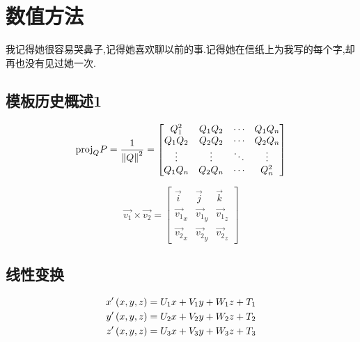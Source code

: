 \chapter{数值方法}
\begin{center}
    \textcolor[RGB]{255, 0, 0}{\faHeart}我记得她很容易哭鼻子,记得她喜欢聊以前的事.记得她在信纸上为我写的每个字,却再也没有见过她一次.\textcolor[RGB]{255, 0, 0}{\faHeart}
\end{center}
\vspace{-5pt}
\begin{center}
\end{center}

\section{模板历史概述1}
\[
    \mathrm{proj}_QP=\frac{1}{\left\| Q \right\|^2}=
    \begin{bmatrix}
        Q_1^2  & Q_1Q_2 & \cdots & Q_1Q_n \\
        Q_1Q_2 & Q_2Q_2 & \cdots & Q_2Q_n \\
        \vdots & \vdots & \ddots & \vdots \\
        Q_1Q_n & Q_2Q_n & \cdots & Q_n^2  \\
    \end{bmatrix}
\]

\[
    \overrightarrow{v_1} \times \overrightarrow{v_2} = \begin{bmatrix}
        \vec{i}                & \vec{j}                & \vec{k}                \\
        \overrightarrow{v_1}_x & \overrightarrow{v_1}_y & \overrightarrow{v_1}_z \\
        \overrightarrow{v_2}_x & \overrightarrow{v_2}_y & \overrightarrow{v_2}_z
    \end{bmatrix}
\]

\section{线性变换}

\begin{align*}
    x'\left(x,y,z\right) & = U_1x+V_1y+W_1z+T_1 \\
    y'\left(x,y,z\right) & = U_2x+V_2y+W_2z+T_2 \\
    z'\left(x,y,z\right) & = U_3x+V_3y+W_3z+T_3
\end{align*}

